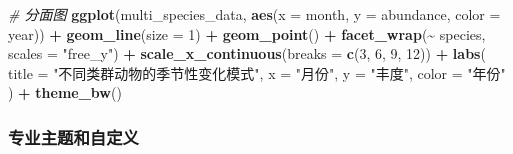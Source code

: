 \documentclass[
]{book}
\newenvironment{Shaded}{\begin{snugshade}}{\end{snugshade}}
\newcommand{\AttributeTok}[1]{\textcolor[rgb]{0.13,0.29,0.53}{#1}}
\newcommand{\CommentTok}[1]{\textcolor[rgb]{0.56,0.35,0.01}{\textit{#1}}}
\newcommand{\DecValTok}[1]{\textcolor[rgb]{0.00,0.00,0.81}{#1}}
\newcommand{\FunctionTok}[1]{\textcolor[rgb]{0.13,0.29,0.53}{\textbf{#1}}}
\newcommand{\NormalTok}[1]{#1}
\newcommand{\SpecialCharTok}[1]{\textcolor[rgb]{0.81,0.36,0.00}{\textbf{#1}}}
\newcommand{\StringTok}[1]{\textcolor[rgb]{0.31,0.60,0.02}{#1}}
\begin{document}
\begin{Shaded}
\begin{Highlighting}[]
\CommentTok{\# 分面图}
\FunctionTok{ggplot}\NormalTok{(multi\_species\_data, }\FunctionTok{aes}\NormalTok{(}\AttributeTok{x =}\NormalTok{ month, }\AttributeTok{y =}\NormalTok{ abundance, }\AttributeTok{color =}\NormalTok{ year)) }\SpecialCharTok{+}
  \FunctionTok{geom\_line}\NormalTok{(}\AttributeTok{size =} \DecValTok{1}\NormalTok{) }\SpecialCharTok{+}
  \FunctionTok{geom\_point}\NormalTok{() }\SpecialCharTok{+}
  \FunctionTok{facet\_wrap}\NormalTok{(}\SpecialCharTok{\textasciitilde{}}\NormalTok{ species, }\AttributeTok{scales =} \StringTok{"free\_y"}\NormalTok{) }\SpecialCharTok{+}
  \FunctionTok{scale\_x\_continuous}\NormalTok{(}\AttributeTok{breaks =} \FunctionTok{c}\NormalTok{(}\DecValTok{3}\NormalTok{, }\DecValTok{6}\NormalTok{, }\DecValTok{9}\NormalTok{, }\DecValTok{12}\NormalTok{)) }\SpecialCharTok{+}
  \FunctionTok{labs}\NormalTok{(}
    \AttributeTok{title =} \StringTok{"不同类群动物的季节性变化模式"}\NormalTok{,}
    \AttributeTok{x =} \StringTok{"月份"}\NormalTok{,}
    \AttributeTok{y =} \StringTok{"丰度"}\NormalTok{,}
    \AttributeTok{color =} \StringTok{"年份"}
\NormalTok{  ) }\SpecialCharTok{+}
  \FunctionTok{theme\_bw}\NormalTok{()}
\end{Highlighting}
\end{Shaded}

\hypertarget{ux4e13ux4e1aux4e3bux9898ux548cux81eaux5b9aux4e49}{%
\subsubsection{专业主题和自定义}\label{ux4e13ux4e1aux4e3bux9898ux548cux81eaux5b9aux4e49}}
\end{document}
